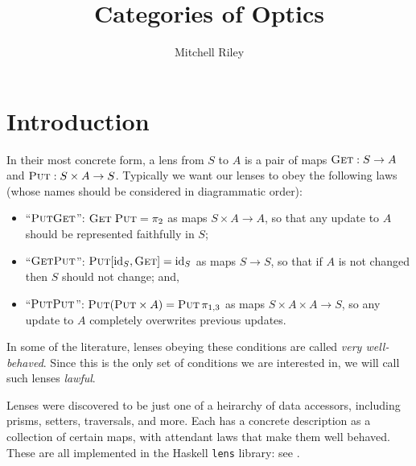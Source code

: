 \documentclass[11pt,a4paper]{article}
\title{Categories of Optics}
\author{Mitchell Riley}
\affil{Wesleyan University \\ \texttt{mvriley@wesleyan.edu}}
\theoremstyle{plain}
\theoremstyle{definition}
\newcommand{\lenslib}{\texttt{lens}}
\newcommand{\id}{\mathrm{id}}
\newcommand{\fget}{\textsc{Get}}
\newcommand{\fput}{\textsc{Put}}
\newcommand{\todo}[1]{\textcolor{red}{\small #1}}
\begin{document}
\maketitle

\section{Introduction}


In their most concrete form, a lens from $S$ to $A$ is a pair of maps $\fget : S \to A$ and $\fput : S \times A \to S$. Typically we want our lenses to obey the following laws (whose names should be considered in diagrammatic order): 
\begin{itemize}
\item ``$\fput\fget$'': $\fget \; \fput = \pi_2$ as maps $S \times A \to A$, so that any update to $A$ should be represented faithfully in $S$;
\item ``$\fget\fput$'': $\fput [\id_S, \fget] = \id_S$ as maps $S \to S$, so that if $A$ is not changed then $S$ should not change; and,
\item ``$\fput\fput$'': $\fput (\fput \times A) = \fput \, \pi_{1, 3}$ as maps $S \times A \times A \to S$, so any update to $A$ completely overwrites previous updates.
\end{itemize}
In some of the literature, lenses obeying these conditions are called \emph{very well-behaved}. Since this is the only set of conditions we are interested in, we will call such lenses \emph{lawful}.

Lenses were discovered to be just one of a heirarchy of data accessors, including prisms, setters, traversals, and more. Each has a concrete description as a collection of certain maps, with attendant laws that make them well behaved. These are all implemented in the Haskell \lenslib{} library: see \cite{LensLibrary}.
\end{document}
